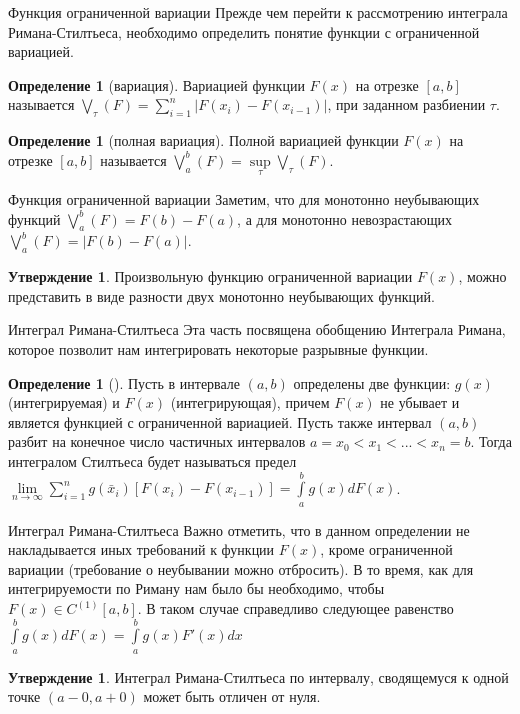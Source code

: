 \documentclass{beamer}%
\theoremstyle{definition}
\newtheorem{mydef}[theorem]{Определение}
\newtheorem{proposition}[theorem]{Утверждение}
\begin{document}
\begin{frame}{Функция ограниченной вариации}
Прежде чем перейти к рассмотрению интеграла Римана-Стилтьеса, необходимо определить понятие функции с ограниченной вариацией.
\begin{mydef}[вариация]
    Вариацией функции $F(x)$ на отрезке $[a, b]$ называется $\bigvee_\tau (F) = \sum \limits_{i=1}^{n} |F(x_i) - F(x_{i-1})|$, при заданном разбиении $\tau$.
\end{mydef}

\begin{mydef}[полная вариация]
    Полной вариацией функции $F(x)$ на отрезке $[a, b]$ называется $\bigvee \limits_{a}^{b} (F) = \sup \limits_{\tau} \bigvee_\tau (F)$.
\end{mydef}

\end{frame}

\begin{frame}{Функция ограниченной вариации}
Заметим, что для монотонно неубывающих функций $\bigvee \limits_{a}^{b} (F) = F(b) - F(a)$, а для монотонно невозрастающих $\bigvee \limits_{a}^{b} (F) = |F(b) - F(a)|$.

\begin{proposition}
    Произвольную функцию ограниченной вариации $F(x)$, можно представить в виде разности двух монотонно неубывающих функций.
\end{proposition}
\end{frame}

\begin{frame}{Интеграл Римана-Стилтьеса}
Эта часть посвящена обобщению Интеграла Римана, которое позволит нам интегрировать некоторые разрывные функции.
\begin{mydef}[]
    Пусть в интервале $(a, b)$ определены две функции: $g(x)$ (интегрируемая) и $F(x)$ (интегрирующая), причем $F(x)$ не убывает и является функцией с ограниченной вариацией. Пусть также интервал $(a, b)$ разбит на конечное число частичных интервалов $a=x_0 < x_1 < ... < x_n = b$. Тогда интегралом Стилтьеса будет называться предел $\lim \limits_{n \rightarrow \infty} \sum \limits_{i=1}^{n} g(\bar x_i) [F(x_i) - F(x_{i-1})] = \int \limits_{a}^{b} g(x) dF(x)$.
\end{mydef}

\end{frame}

\begin{frame}{Интеграл Римана-Стилтьеса}
Важно отметить, что в данном определении не накладывается иных требований к функции $F(x)$, кроме ограниченной вариации (требование о неубывании можно отбросить). В то время, как для интегрируемости по Риману нам было бы необходимо, чтобы $F(x) \in C^{(1)}[a, b]$. В таком случае справедливо следующее равенство $\int \limits_{a}^{b} g(x) dF(x) = \int \limits_{a}^{b} g(x) F'(x) dx$

\begin{proposition}
    Интеграл Римана-Стилтьеса по интервалу, сводящемуся к одной точке $(a - 0, a + 0)$ может быть отличен от нуля. 
\end{proposition}
\end{frame}
\end{document}
